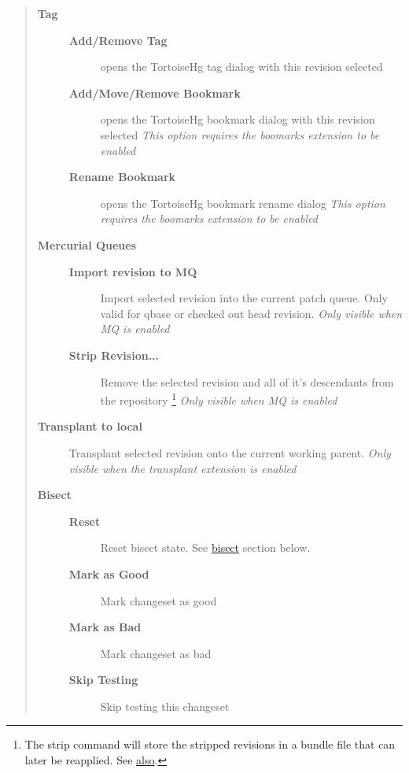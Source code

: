 \documentclass[letterpaper,10pt,english]{manual}
\begin{document}
\begin{quote}
\begin{description}
\begin{description}
\end{description}

\item[\textbf{Tag}]\begin{description}
\item[\textbf{Add/Remove Tag}]
opens the TortoiseHg tag dialog with this revision selected

\item[\textbf{Add/Move/Remove Bookmark}]
opens the TortoiseHg bookmark dialog with this revision selected
\emph{This option requires the boomarks extension to be enabled}

\item[\textbf{Rename Bookmark}]
opens the TortoiseHg bookmark rename dialog
\emph{This option requires the boomarks extension to be enabled}

\end{description}

\item[\textbf{Mercurial Queues}]\begin{description}
\item[\textbf{Import revision to MQ}]
Import selected revision into the current patch queue.  Only
valid for qbase or checked out head revision.  \emph{Only visible
when MQ is enabled}

\item[\textbf{Strip Revision...}]
Remove the selected revision and all of it's descendants from the
repository \footnote{
The strip command will store the stripped revisions in a bundle file
that can later be reapplied.
See \href{http://mercurial.selenic.com/wiki/EditingHistory}{also}.
} \emph{Only visible when MQ is enabled}

\end{description}

\item[\textbf{Transplant to local}]
Transplant selected revision onto the current working parent.
\emph{Only visible when the transplant extension is enabled}

\item[\textbf{Bisect}]\begin{description}
\item[\textbf{Reset}]
Reset bisect state. See \hyperlink{id10}{bisect} section below.

\item[\textbf{Mark as Good}]
Mark changeset as good

\item[\textbf{Mark as Bad}]
Mark changeset as bad

\item[\textbf{Skip Testing}]
Skip testing this changeset

\end{description}

\end{description}
\end{quote}
\end{document}
